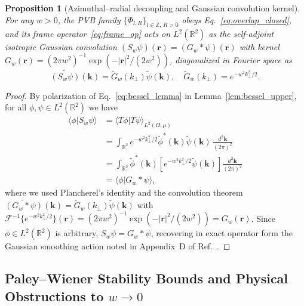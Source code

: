 \documentclass[aps,pra,reprint,nofootinbib,floatfix,longbibliography]{revtex4-2}
\newtheorem{proposition}{Proposition}
\theoremstyle{remark}
\newcommand{\braket}[2]{\langle #1 | #2 \rangle}
\newcommand{\abs}[1]{\lvert #1 \rvert}
\begin{document}
\begin{proposition}[Azimuthal--radial decoupling and Gaussian convolution kernel]
\label{prop:conv_kernel}
For any $w > 0$, the PVB family $\{\Phi_{l,R}\}_{l\in\mathbb{Z},\,R>0}$ obeys Eq.~\eqref{eq:overlap_closed}, and its frame operator~\eqref{eq:frame_op} acts on $L^2(\mathbb{R}^2)$ as the self-adjoint isotropic Gaussian convolution $(S_w\psi)(\mathbf{r}) = (G_w * \psi)(\mathbf{r})$ with kernel $G_w(\mathbf{r}) = (2\pi w^2)^{-1}\exp(-\abs{\mathbf{r}}^2/(2w^2))$, diagonalized in Fourier space as
\begin{equation}
\widetilde{(S_w\psi)}(\mathbf{k}) = \widetilde{G}_w(k_\perp)\widetilde{\psi}(\mathbf{k}), \quad \widetilde{G}_w(k_\perp) = e^{-w^2 k_\perp^2/2}.
\label{eq:fourier_diag}
\end{equation}
\end{proposition}
\begin{proof}
By polarization of Eq.~\eqref{eq:bessel_lemma} in Lemma~\ref{lem:bessel_upper}, for all $\phi,\psi \in L^2(\mathbb{R}^2)$ we have
\begin{align}
\braket{\phi}{S_w\psi} &= \braket{T\phi}{T\psi}_{L^2(\Omega,\mu)} \nonumber \\
&= \int_{\mathbb{R}^2} e^{-w^2 k_\perp^2/2}\widetilde{\phi}^*(\mathbf{k})\widetilde{\psi}(\mathbf{k})\,\frac{d^2\mathbf{k}}{(2\pi)^2} \nonumber \\
&= \int_{\mathbb{R}^2} \widetilde{\phi}^*(\mathbf{k})\!\left[e^{-w^2 k_\perp^2/2}\widetilde{\psi}(\mathbf{k})\right]\frac{d^2\mathbf{k}}{(2\pi)^2} \nonumber \\
&= \braket{\phi}{G_w * \psi},
\label{eq:prop1_polarization}
\end{align}
where we used Plancherel's identity and the convolution theorem $\widetilde{(G_w * \psi)}(\mathbf{k}) = \widetilde{G}_w(k_\perp)\widetilde{\psi}(\mathbf{k})$ with $\mathcal{F}^{-1}\{e^{-w^2 k_\perp^2/2}\}(\mathbf{r}) = (2\pi w^2)^{-1}\exp(-\abs{\mathbf{r}}^2/(2w^2)) = G_w(\mathbf{r})$. Since $\phi \in L^2(\mathbb{R}^2)$ is arbitrary, $S_w\psi = G_w * \psi$, recovering in exact operator form the Gaussian smoothing action noted in Appendix~D of Ref.~\cite{Ferreira2026}.
\end{proof}

\subsection{Paley--Wiener Stability Bounds and Physical Obstructions to \texorpdfstring{$w \to 0$}{w -> 0}}
\label{subsec:paley_wiener}
\end{document}
